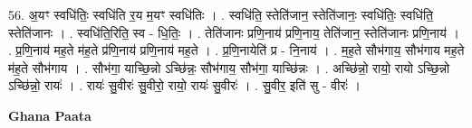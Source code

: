 \documentclass[17pt]{extarticle}
\begin{document}
56. अ॒यꣳ स्वधि॑तिः॒ स्वधि॑ति र॒य म॒यꣳ स्वधि॑तिः । . स्वधि॑ति॒ स्तेति॑जान॒ स्तेति॑जानः॒ स्वधि॑तिः॒ स्वधि॑ति॒ स्तेति॑जानः । . स्वधि॑ति॒रिति॒ स्व - धि॒तिः॒ । . तेति॑जानः प्रणि॒नाय॑ प्रणि॒नाय॒ तेति॑जान॒ स्तेति॑जानः प्रणि॒नाय॑ । . प्र॒णि॒नाय॑ मह॒ते म॑ह॒ते प्र॑णि॒नाय॑ प्रणि॒नाय॑ मह॒ते । . प्र॒णि॒नायेति॑ प्र - नि॒नाय॑ । . म॒ह॒ते सौभ॑गाय॒ सौभ॑गाय मह॒ते म॑ह॒ते सौभ॑गाय । . सौभ॑गा॒ याच्छि॒न्नो ऽच्छि॑न्नः॒ सौभ॑गाय॒ सौभ॑गा॒ याच्छि॑न्नः । . अच्छि॑न्नो॒ रायो॒ रायो ऽच्छि॒न्नो ऽच्छि॑न्नो॒ रायः॑ । . रायः॑ सु॒वीरः॑ सु॒वीरो॒ रायो॒ रायः॑ सु॒वीरः॑ । . सु॒वीर॒ इति॑ सु - वीरः॑ । \newline

\textbf{Ghana Paata } \newline
\end{document}
